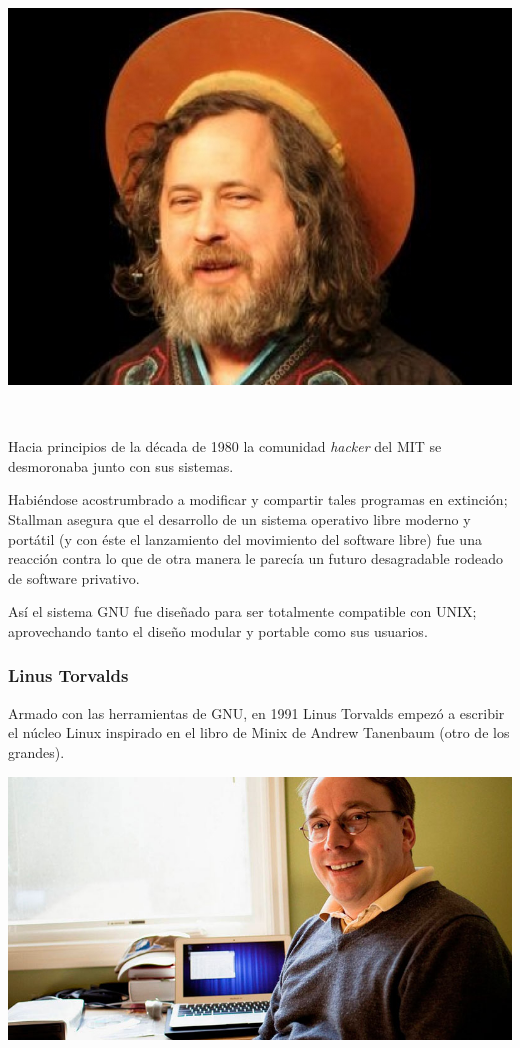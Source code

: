\documentclass[11pt]{article}
\begin{document}
\begin{center}
\includegraphics[width=.9\linewidth]{Versiones/stallman.jpg}
\end{center}  

Hacia principios de la década de 1980 la comunidad \emph{hacker} del MIT se
desmoronaba junto con sus sistemas.

Habiéndose acostrumbrado a modificar y compartir tales programas en
extinción; Stallman asegura que el desarrollo de un sistema operativo
libre moderno y portátil (y con éste el lanzamiento del movimiento del
software libre) fue una reacción contra lo que de otra manera le parecía
un futuro desagradable rodeado de software privativo.

Así el sistema GNU fue diseñado para ser totalmente compatible con UNIX;
aprovechando tanto el diseño modular y portable como sus usuarios.

\subsubsection{Linus Torvalds}
\label{sec:org0bbf5ff}
Armado con las herramientas de GNU, en 1991 Linus Torvalds empezó a
escribir el núcleo Linux inspirado en el libro de Minix de Andrew
Tanenbaum (otro de los grandes).

\begin{center}
\includegraphics[width=.9\linewidth]{Versiones/Linus-Torvalds.jpg}
\end{center}  
\end{document}
